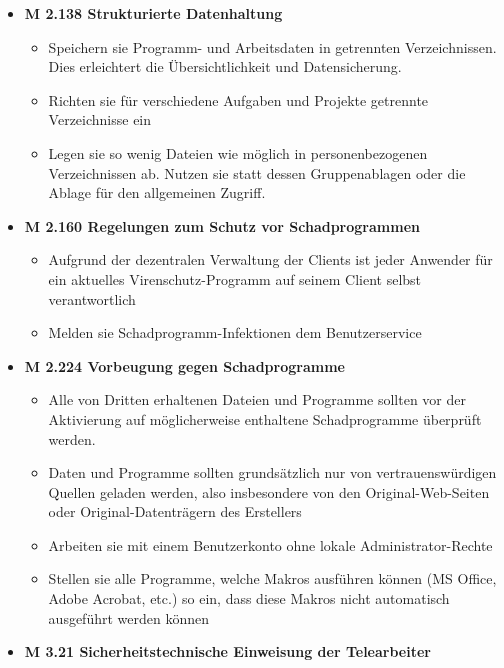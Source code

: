 \documentclass[]{article}
\begin{document}
\begin{itemize}
\item
  \textbf{M 2.138 Strukturierte Datenhaltung}

  \begin{itemize}
  \item
    Speichern sie Programm- und Arbeitsdaten in getrennten
    Verzeichnissen. Dies erleichtert die Übersichtlichkeit und
    Datensicherung.
  \item
    Richten sie für verschiedene Aufgaben und Projekte getrennte
    Verzeichnisse ein
  \item
    Legen sie so wenig Dateien wie möglich in personenbezogenen
    Verzeichnissen ab. Nutzen sie statt dessen Gruppenablagen oder die
    Ablage für den allgemeinen Zugriff.
  \end{itemize}
\item
  \textbf{M 2.160 Regelungen zum Schutz vor Schadprogrammen}

  \begin{itemize}
  \item
    Aufgrund der dezentralen Verwaltung der Clients ist jeder Anwender
    für ein aktuelles Virenschutz-Programm auf seinem Client selbst
    verantwortlich
  \item
    Melden sie Schadprogramm-Infektionen dem Benutzerservice
  \end{itemize}
\item
  \textbf{M 2.224 Vorbeugung gegen Schadprogramme}

  \begin{itemize}
  \item
    Alle von Dritten erhaltenen Dateien und Programme sollten vor der
    Aktivierung auf möglicherweise enthaltene Schadprogramme überprüft
    werden.
  \item
    Daten und Programme sollten grundsätzlich nur von vertrauenswürdigen
    Quellen geladen werden, also insbesondere von den
    Original-Web-Seiten oder Original-Datenträgern des Erstellers
  \item
    Arbeiten sie mit einem Benutzerkonto ohne lokale
    Administrator-Rechte
  \item
    Stellen sie alle Programme, welche Makros ausführen können (MS
    Office, Adobe Acrobat, etc.) so ein, dass diese Makros nicht
    automatisch ausgeführt werden können
  \end{itemize}
\item
  \textbf{M 3.21 Sicherheitstechnische Einweisung der Telearbeiter}


\end{itemize}
\end{document}
